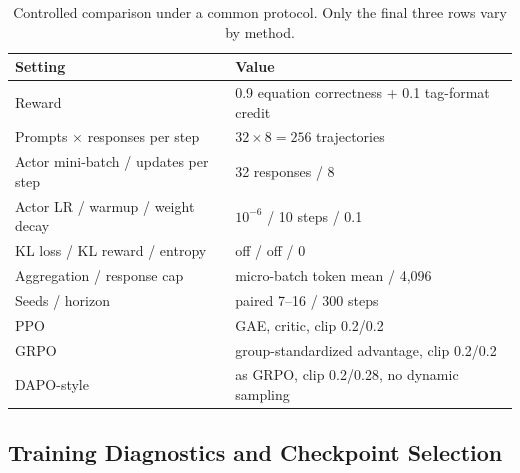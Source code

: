 \documentclass[ai,article,submit,oneauthor]{Definitions/mdpi}
\begin{document}
\begin{table}[H]
\caption{Controlled comparison under a common protocol. Only the final three rows vary by method.}
\label{tab:matched_design}
\centering
\small
\begin{tabular}{@{}ll@{}}
\toprule
Setting & Value \\
\midrule
Reward & 0.9 equation correctness + 0.1 tag-format credit \\
Prompts $\times$ responses per step & $32\times8=256$ trajectories \\
Actor mini-batch / updates per step & 32 responses / 8 \\
Actor LR / warmup / weight decay & $10^{-6}$ / 10 steps / 0.1 \\
KL loss / KL reward / entropy & off / off / 0 \\
Aggregation / response cap & micro-batch token mean / 4,096 \\
Seeds / horizon & paired 7--16 / 300 steps \\
\midrule
PPO & GAE, critic, clip 0.2/0.2 \\
GRPO & group-standardized advantage, clip 0.2/0.2 \\
DAPO-style & as GRPO, clip 0.2/0.28, no dynamic sampling \\
\bottomrule
\end{tabular}
\end{table}

\subsection{Training Diagnostics and Checkpoint Selection}
\end{document}
